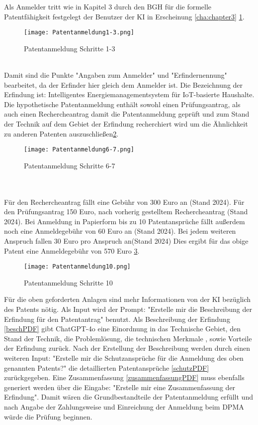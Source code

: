 Als Anmelder tritt wie in Kapitel 3 durch den BGH für die formelle 
Patentfähigkeit festgelegt der Benutzer
der KI in Erscheinung \ref{cha:chapter3} \ref{fig:Pat1-3}.
\begin{figure}[htb]
    \centering
    \texttt{[image: Patentanmeldung1-3.png]}\\
    \caption{ Patentanmeldung Schritte 1-3 }\label{fig:Pat1-3}
\end{figure}
\\
Damit sind die Punkte "Angaben zum Anmelder" und "Erfindernennung" bearbeitet, 
da der Erfinder hier gleich dem Anmelder ist.
Die Bezeichnung der Erfindung ist:
Intelligentes Energiemanagementsystem für IoT-basierte Haushalte.
Die hypothetische Patentanmeldung enthält sowohl einen Prüfungsantrag, 
als auch einen Rechercheantrag damit die Patentanmeldung
geprüft und zum Stand der Technik auf dem Gebiet 
der Erfindung recherchiert wird um die Ähnlichkeit
zu anderen Patenten auszuschließen\ref{fig:Pat6-7}.
\begin{figure}[htb]
    \centering
    \texttt{[image: Patentanmeldung6-7.png]}\\
    \caption{ Patentanmeldung Schritte 6-7 }\label{fig:Pat6-7}
\end{figure}
\\
\\
Für den Rechercheantrag fällt eine Gebühr von 300 Euro an (Stand 2024).
Für den Prüfungsantrag 150 Euro, nach vorherig gestelltem Rechercheantrag (Stand 2024).
Bei Anmeldung in Papierform bis zu 10 Patentansprüche fällt außerdem noch eine
Anmeldegebühr von 60 Euro an (Stand 2024). Bei jedem weiteren Anspruch
fallen 30 Euro pro Anspruch an(Stand 2024) Dies ergibt für das obige Patent 
eine Anmeldegebühr von 570 Euro \cite{DPMAPatente} \ref{fig:Pat10}.
\begin{figure}[htb]
    \centering
    \texttt{[image: Patentanmeldung10.png]}\\
    \caption{ Patentanmeldung Schritte 10 }\label{fig:Pat10}
\end{figure}

Für die oben geforderten Anlagen sind mehr Informationen von der KI
bezüglich des Patents nötig.
Als Input wird der Prompt:
"Erstelle mir die Beschreibung der Erfindung für den Patentantrag" benutzt.
Als Beschreibung der Erfindung \ref{beschPDF} gibt ChatGPT-4o eine Einordnung 
in das Technische Gebiet, den Stand der Technik, die Problemlösung,
die technischen Merkmale , sowie Vorteile der Erfindung zurück.
Nach der Erstellung der Beschreibung werden durch einen weiteren Input:
"Erstelle mir die Schutzansprüche für die Anmeldung des oben genannten Patents?"
die detaillierten Patentansprüche \ref{schutzPDF} 
zurückgegeben.
Eine Zusammenfassung \ref{zusammenfassungPDF} muss ebenfalls
generiert werden über die Eingabe:
"Erstelle mir eine Zusammenfassung der Erfindung". 
Damit wären die Grundbestandteile der Patentanmeldung erfüllt und nach Angabe der 
Zahlungsweise und
Einreichung der Anmeldung beim DPMA würde die Prüfung beginnen. 

